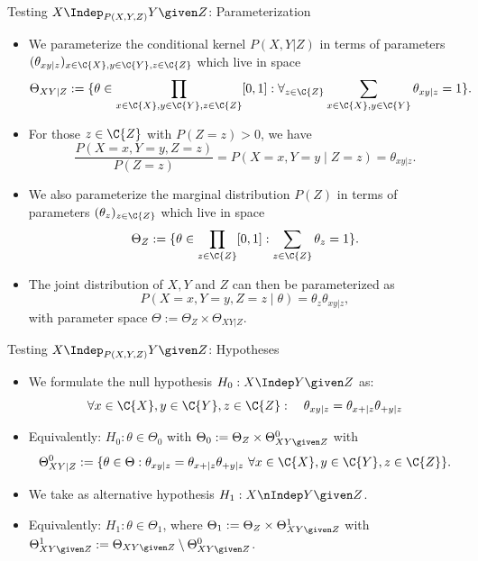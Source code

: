 \begin{frame}{Testing $X \Indep_{P(X,Y,Z)} Y \given Z$: Parameterization}
  \begin{itemize}
    \item We parameterize the conditional kernel $P(X,Y | Z)$ in terms of parameters
$(\theta_{xy|z})_{x\in\C{X},y\in\C{Y},z\in\C{Z}}$ which live in space
$$\Theta_{XY|Z} := %
\{ \theta \in \prod_{x\in\C{X},y\in\C{Y},z\in\C{Z}} [0,1] : \forall_{z\in\C{Z}} \sum_{x\in\C{X},y\in\C{Y}} \theta_{xy|z} = 1\}.$$
\item For those $z\in\C{Z}$ with $P(Z = z) > 0$, we have 
$$\frac{P(X = x, Y = y, Z = z)}{P(Z=z)} = P(X = x, Y = y \mid Z=z) = \theta_{xy|z}.$$
\item We also parameterize the marginal distribution $P(Z)$ in terms of parameters
$(\theta_z)_{z\in\C{Z}}$ which live in space
$$\Theta_Z := \{ \theta \in \prod_{z\in\C{Z}} [0,1] : \sum_{z\in\C{Z}} \theta_z = 1\}.$$
\item The joint distribution of $X,Y$ and $Z$ can then be parameterized as
$$P(X=x,Y=y,Z=z \mid \theta) = \theta_z \theta_{xy|z},$$
with parameter space $\Theta := \Theta_Z\times \Theta_{XY|Z}.$
  \end{itemize}
\end{frame}

\begin{frame}{Testing $X \Indep_{P(X,Y,Z)} Y \given Z$: Hypotheses}
  \begin{itemize}
    \item We formulate the null hypothesis $H_0 : X \Indep Y \given Z$ as:
$$\forall x \in \C{X}, y \in \C{Y}, z \in \C{Z}: \quad \theta_{xy|z} = \theta_{x+|z} \theta_{+ y|z}$$
    \item Equivalently: $H_0 : \theta \in \Theta_0$ with $\Theta_0 := \Theta_Z \times \Theta_{XY\given Z}^0$ with
      $$\Theta_{XY|Z}^0 := \{\theta \in \Theta : \theta_{xy|z} = \theta_{x+|z} \theta_{+ y|z}\ \forall x \in \C{X}, y \in \C{Y}, z \in \C{Z}\}.$$
    \item We take as alternative hypothesis $H_1 : X \nIndep Y \given Z$.
    \item Equivalently: $H_1 : \theta \in \Theta_1$, where
$\Theta_1 := \Theta_Z \times \Theta_{XY\given Z}^1$ with $\Theta_{XY\given Z}^1 := \Theta_{XY\given Z} \setminus \Theta_{XY\given Z}^0$.
  \end{itemize}
\end{frame}

